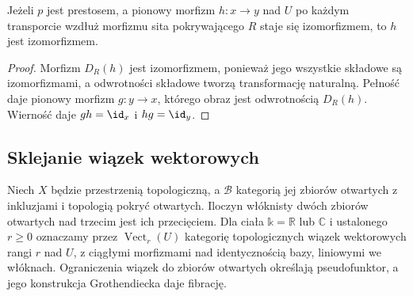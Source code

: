 \begin{wniosek}\label{cat:cor:prestack-local-isomorphisms}
Jeżeli $p$ jest prestosem, a pionowy morfizm $h:x\to y$ nad $U$ po każdym transporcie wzdłuż morfizmu sita pokrywającego $R$ staje się izomorfizmem, to $h$ jest izomorfizmem.
\end{wniosek}
\begin{proof}
Morfizm $D_R(h)$ jest izomorfizmem, ponieważ jego wszystkie składowe są izomorfizmami, a odwrotności składowe tworzą transformację naturalną. Pełność daje pionowy morfizm $g:y\to x$, którego obraz jest odwrotnością $D_R(h)$. Wierność daje $gh=\id_x$ i $hg=\id_y$.
\end{proof}

\subsection{Sklejanie wiązek wektorowych}

Niech $X$ będzie przestrzenią topologiczną, a $\mathcal B$ kategorią jej zbiorów otwartych z inkluzjami i topologią pokryć otwartych. Iloczyn włóknisty dwóch zbiorów otwartych nad trzecim jest ich przecięciem. Dla ciała $\mathbb k=\mathbb R$ lub $\mathbb C$ i ustalonego $r\geq0$ oznaczamy przez $\operatorname{Vect}_r(U)$ kategorię topologicznych wiązek wektorowych rangi $r$ nad $U$, z ciągłymi morfizmami nad identycznością bazy, liniowymi we włóknach. Ograniczenia wiązek do zbiorów otwartych określają pseudofunktor, a jego konstrukcja Grothendiecka daje fibrację.


